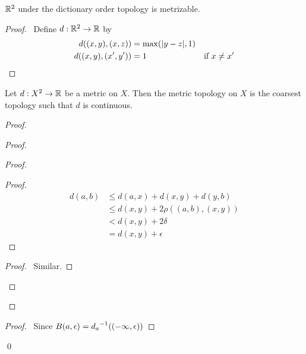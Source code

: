 \begin{proposition}
    $\RR^2$ under the dictionary order topology is metrizable.
\end{proposition}

\begin{proof}
    \pf\ Define $d : \RR^2 \rightarrow \RR$ by
    \begin{align*}
        d((x,y),(x,z)) & = \max(|y-z|,1) \\
        d((x,y),(x',y')) & = 1 & \text{if } x \neq x' \qed
    \end{align*}        
\end{proof}

\begin{proposition}
    Let $d : X^2 \rightarrow \RR$ be a metric on $X$. Then the metric topology on $X$ is the coarsest topology such that $d$ is continuous.
\end{proposition}

\begin{proof}
    \pf
    \begin{proof}
        \begin{proof}
            \begin{proof}
                \pf
                \begin{align*}
                    d(a,b) & \leq d(a,x) + d(x,y) + d(y,b) \\
                    & \leq d(x,y) + 2 \rho((a,b),(x,y)) \\
                    & < d(x,y) + 2 \delta \\
                    & = d(x,y) + \epsilon
                \end{align*}
            \end{proof}
            \begin{proof}
                \pf\ Similar.
            \end{proof}
        \end{proof}
        \qedstep
    \end{proof}
    \begin{proof}
        \pf\ Since $B(a, \epsilon) = \inv{d_a}((-\infty, \epsilon))$
    \end{proof}
    \qed    
\end{proof}

